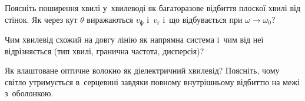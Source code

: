 \begin{Questions}
\begin{quizlist}
		\item Поясніть поширення хвилі у~хвилеводі як багаторазове відбиття плоскої хвилі від стінок. Як через кут $\theta$ виражаються $v_\text{ф}$ і~$v_\text{г}$ і~що відбувається при $\omega\to\omega_0$?
		\item Чим хвилевід схожий на довгу лінію як напрямна система і~чим від неї відрізняється (тип хвилі, гранична частота, дисперсія)?
		\item Як влаштоване оптичне волокно як діелектричний хвилевід? Поясніть, чому світло утримується в~серцевині завдяки повному внутрішньому відбиттю на межі з~оболонкою.
	\end{quizlist}
\end{Questions}

